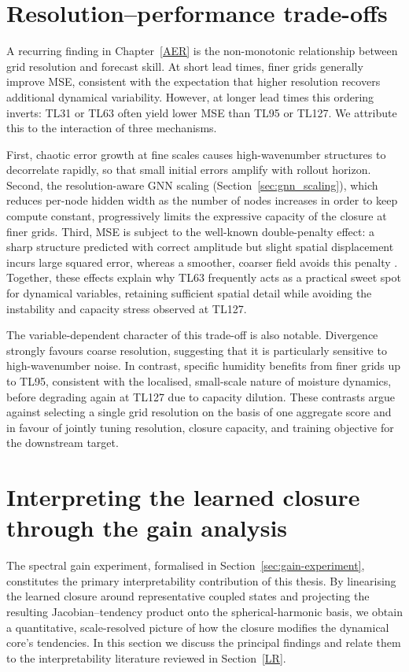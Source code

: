 \section{Resolution--performance trade-offs}

A recurring finding in Chapter~\ref{AER} is the non-monotonic relationship between grid resolution and forecast skill. At short lead times, finer grids generally improve MSE, consistent with the expectation that higher resolution recovers additional dynamical variability. However, at longer lead times this ordering inverts: TL31 or TL63 often yield lower MSE than TL95 or TL127. We attribute this to the interaction of three mechanisms.

First, chaotic error growth at fine scales causes high-wavenumber structures to decorrelate rapidly, so that small initial errors amplify with rollout horizon. Second, the resolution-aware GNN scaling (Section~\ref{sec:gnn_scaling}), which reduces per-node hidden width as the number of nodes increases in order to keep compute constant, progressively limits the expressive capacity of the closure at finer grids. Third, MSE is subject to the well-known double-penalty effect: a sharp structure predicted with correct amplitude but slight spatial displacement incurs large squared error, whereas a smoother, coarser field avoids this penalty \citep{mass2002does}. Together, these effects explain why TL63 frequently acts as a practical sweet spot for dynamical variables, retaining sufficient spatial detail while avoiding the instability and capacity stress observed at TL127.

The variable-dependent character of this trade-off is also notable. Divergence strongly favours coarse resolution, suggesting that it is particularly sensitive to high-wavenumber noise. In contrast, specific humidity benefits from finer grids up to TL95, consistent with the localised, small-scale nature of moisture dynamics, before degrading again at TL127 due to capacity dilution. These contrasts argue against selecting a single grid resolution on the basis of one aggregate score and in favour of jointly tuning resolution, closure capacity, and training objective for the downstream target.

\section{Interpreting the learned closure through the gain analysis}
\label{sec:discuss_gain}

The spectral gain experiment, formalised in Section~\ref{sec:gain-experiment}, constitutes the primary interpretability contribution of this thesis. By linearising the learned closure around representative coupled states and projecting the resulting Jacobian--tendency product onto the spherical-harmonic basis, we obtain a quantitative, scale-resolved picture of how the closure modifies the dynamical core's tendencies. In this section we discuss the principal findings and relate them to the interpretability literature reviewed in Section~\ref{LR}.

